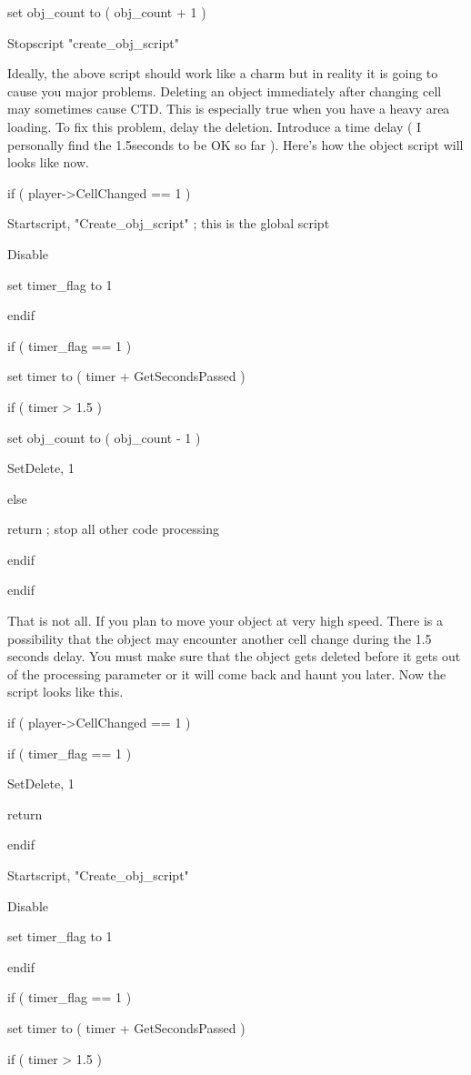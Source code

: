 set obj\_count to ( obj\_count + 1 )

Stopscript "create\_obj\_script"

Ideally, the above script should work like a charm but in reality it is
going to cause you major problems. Deleting an object immediately after
changing cell may sometimes cause CTD. This is especially true when you
have a heavy area loading. To fix this problem, delay the deletion.
Introduce a time delay ( I personally find the 1.5seconds to be OK so
far ). Here's how the object script will looks like now.

if ( player-\textgreater CellChanged == 1 )

Startscript, "Create\_obj\_script" ; this is the global script

Disable

set timer\_flag to 1

endif

if ( timer\_flag == 1 )

set timer to ( timer + GetSecondsPassed )

if ( timer \textgreater{} 1.5 )

set obj\_count to ( obj\_count - 1 )

SetDelete, 1

else

return ; stop all other code processing

endif

endif

That is not all. If you plan to move your object at very high speed.
There is a possibility that the object may encounter another cell change
during the 1.5 seconds delay. You must make sure that the object gets
deleted before it gets out of the processing parameter or it will come
back and haunt you later. Now the script looks like this.

if ( player-\textgreater CellChanged == 1 )

if ( timer\_flag == 1 )

SetDelete, 1

return

endif

Startscript, "Create\_obj\_script"

Disable

set timer\_flag to 1

endif

if ( timer\_flag == 1 )

set timer to ( timer + GetSecondsPassed )

if ( timer \textgreater{} 1.5 )


